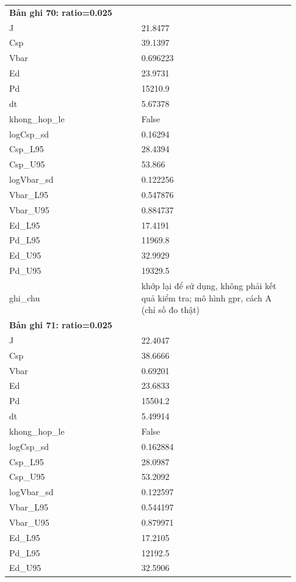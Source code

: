 \begin{longtable}{p{0.43\linewidth}p{0.50\linewidth}}
\midrule
\multicolumn{2}{p{0.95\linewidth}}{\textbf{Bản ghi 70: ratio=0.025}} \\
J & 21.8477 \\
Csp & 39.1397 \\
Vbar & 0.696223 \\
Ed & 23.9731 \\
Pd & 15210.9 \\
dt & 5.67378 \\
khong\_\allowbreak hop\_\allowbreak le & False \\
logCsp\_\allowbreak sd & 0.16294 \\
Csp\_\allowbreak L95 & 28.4394 \\
Csp\_\allowbreak U95 & 53.866 \\
logVbar\_\allowbreak sd & 0.122256 \\
Vbar\_\allowbreak L95 & 0.547876 \\
Vbar\_\allowbreak U95 & 0.884737 \\
Ed\_\allowbreak L95 & 17.4191 \\
Pd\_\allowbreak L95 & 11969.8 \\
Ed\_\allowbreak U95 & 32.9929 \\
Pd\_\allowbreak U95 & 19329.5 \\
ghi\_\allowbreak chu & khớp lại để sử dụng, không phải kết quả kiểm tra; mô hình gpr, cách A (chỉ số đo thật) \\
\midrule
\multicolumn{2}{p{0.95\linewidth}}{\textbf{Bản ghi 71: ratio=0.025}} \\
J & 22.4047 \\
Csp & 38.6666 \\
Vbar & 0.69201 \\
Ed & 23.6833 \\
Pd & 15504.2 \\
dt & 5.49914 \\
khong\_\allowbreak hop\_\allowbreak le & False \\
logCsp\_\allowbreak sd & 0.162884 \\
Csp\_\allowbreak L95 & 28.0987 \\
Csp\_\allowbreak U95 & 53.2092 \\
logVbar\_\allowbreak sd & 0.122597 \\
Vbar\_\allowbreak L95 & 0.544197 \\
Vbar\_\allowbreak U95 & 0.879971 \\
Ed\_\allowbreak L95 & 17.2105 \\
Pd\_\allowbreak L95 & 12192.5 \\
Ed\_\allowbreak U95 & 32.5906 \\

\end{longtable}
